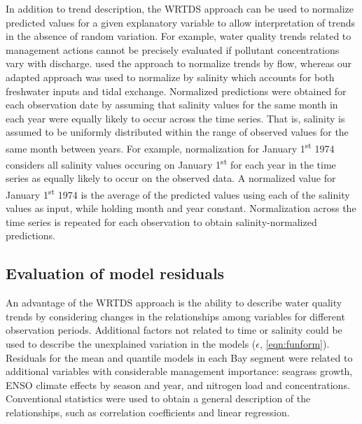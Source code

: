 \documentclass[letterpaper,12pt,oneside]{article}\usepackage[]{graphicx}\usepackage[]{color}
\begin{document}
In addition to trend description, the \ac{WRTDS} approach can be used to normalize predicted values for a given explanatory variable to allow interpretation of trends in the absence of random variation.  For example, water quality trends related to management actions cannot be precisely evaluated if pollutant concentrations vary with discharge.  \citet{Hirsch10} used the approach to normalize trends by flow, whereas our adapted approach was used to normalize by salinity which accounts for both freshwater inputs and tidal exchange.  Normalized predictions were obtained for each observation date by assuming that salinity values for the same month in each year were equally likely to occur across the time series.  That is, salinity is assumed to be uniformly distributed within the range of observed values for the same month between years.  For example, normalization for January 1\textsuperscript{st} 1974 considers all salinity values occuring on January 1\textsuperscript{st} for each year in the time series as equally likely to occur on the observed data.  A normalized value for January 1\textsuperscript{st} 1974 is the average of the predicted values using each of the salinity values as input, while holding month and year constant.  Normalization across the time series is repeated for each observation to obtain salinity-normalized predictions.    

\subsection{Evaluation of model residuals}

An advantage of the \ac{WRTDS} approach is the ability to describe water quality trends by considering changes in the relationships among variables for  different observation periods.  Additional factors not related to time or salinity could be used to describe the unexplained variation in the models ($\epsilon$, \cref{eqn:funform}). Residuals for the mean and quantile models in each Bay segment were related to additional variables with considerable management importance: seagrass growth, \ac{ENSO} climate effects by season and year, and nitrogen load and concentrations.  Conventional statistics were used to obtain a general description of the relationships, such as correlation coefficients and linear regression.
\end{document}

